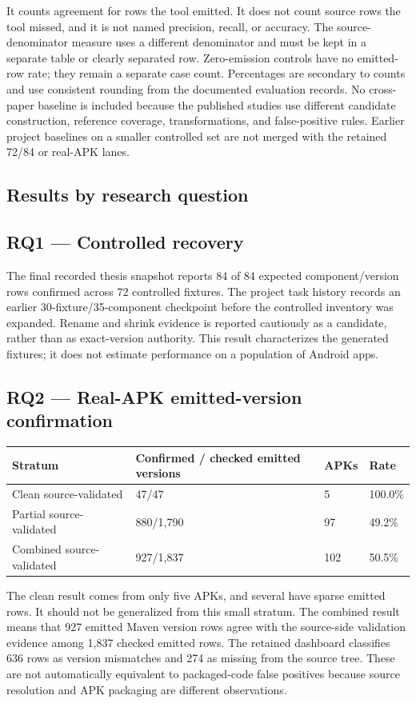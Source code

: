 \documentclass[10pt,twocolumn]{article}
\begin{document}
It counts agreement for rows the tool emitted. It does not count source rows the tool missed, and it is not named precision, recall, or accuracy. The source-denominator measure uses a different denominator and must be kept in a separate table or clearly separated row. Zero-emission controls have no emitted-row rate; they remain a separate case count. Percentages are secondary to counts and use consistent rounding from the documented evaluation records.
No cross-paper baseline is included because the published studies use different candidate construction, reference coverage, transformations, and false-positive rules. Earlier project baselines on a smaller controlled set are not merged with the retained 72/84 or real-APK lanes.
\subsection{Results by research question}
\subsection{RQ1 — Controlled recovery}
The final recorded thesis snapshot reports 84 of 84 expected component/version rows confirmed across 72 controlled fixtures. The project task history records an earlier 30-fixture/35-component checkpoint before the controlled inventory was expanded. Rename and shrink evidence is reported cautiously as a candidate, rather than as exact-version authority. This result characterizes the generated fixtures; it does not estimate performance on a population of Android apps.
\subsection{RQ2 — Real-APK emitted-version confirmation}
\begin{center}\small\begin{tabularx}{\columnwidth}{@{}X@{}X@{}X@{}X@{}}
\textbf{Stratum} & \textbf{Confirmed / checked emitted versions} & \textbf{APKs} & \textbf{Rate} \\
\midrule
Clean source-validated & 47/47 & 5 & 100.0\% \\
Partial source-validated & 880/1,790 & 97 & 49.2\% \\
Combined source-validated & 927/1,837 & 102 & 50.5\% \\
\end{tabularx}\end{center}
The clean result comes from only five APKs, and several have sparse emitted rows. It should not be generalized from this small stratum. The combined result means that 927 emitted Maven version rows agree with the source-side validation evidence among 1,837 checked emitted rows. The retained dashboard classifies 636 rows as version mismatches and 274 as missing from the source tree. These are not automatically equivalent to packaged-code false positives because source resolution and APK packaging are different observations.
\end{document}
